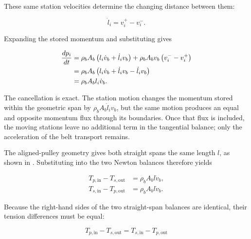 \documentclass[11pt]{report}
\numberwithin{equation}{section}
\begin{document}
These same station velocities determine the changing distance between them:

\begin{equation}
    \dot l_i
    =
    v_i^{+}
    -
    v_i^{-}.
    \label{eq:straight_span_station_kinematics}
\end{equation}

Expanding the stored momentum and substituting
 gives

\begin{align}
    \frac{dp_i}{dt}
    &={}
    \rho_bA_b
    \left(
        l_i\dot v_b+\dot l_i v_b
    \right)
    +
    \rho_bA_bv_b
    \left(
        v_i^{-}
        -
        v_i^{+}
    \right)
    \notag\\
    &=
    \rho_bA_b
    \left(
        l_i\dot v_b+\dot l_i v_b-\dot l_i v_b
    \right)
    \notag\\
    &=
    \rho_bA_b l_i\dot v_b.
    \label{eq:straight_span_moving_boundary_cancellation}
\end{align}

The cancellation is exact. The station motion changes the momentum stored
within the geometric span by $\rho_bA_b\dot l_i v_b$, but the same motion
produces an equal and opposite momentum flux through its boundaries. Once that
flux is included, the moving stations leave no additional term in the
tangential balance; only the acceleration of the belt transport remains.

The aligned-pulley geometry gives both straight spans the same length $l$, as
shown in . Substituting
 into the two Newton
balances therefore yields

\begin{equation}
\begin{aligned}
    T_{p,\mathrm{in}}-T_{s,\mathrm{out}}
    &=
    \rho_bA_b l\dot v_b,
    \\
    T_{s,\mathrm{in}}-T_{p,\mathrm{out}}
    &=
    \rho_bA_b l\dot v_b.
\end{aligned}
    \label{eq:upper_lower_straight_span_balances}
\end{equation}

Because the right-hand sides of the two straight-span balances are identical,
their tension differences must be equal:

\begin{equation}
    T_{p,\mathrm{in}}-T_{s,\mathrm{out}}
    =
    T_{s,\mathrm{in}}-T_{p,\mathrm{out}}
    \label{eq:straight_span_tension_compatibility}
\end{equation}
\end{document}
